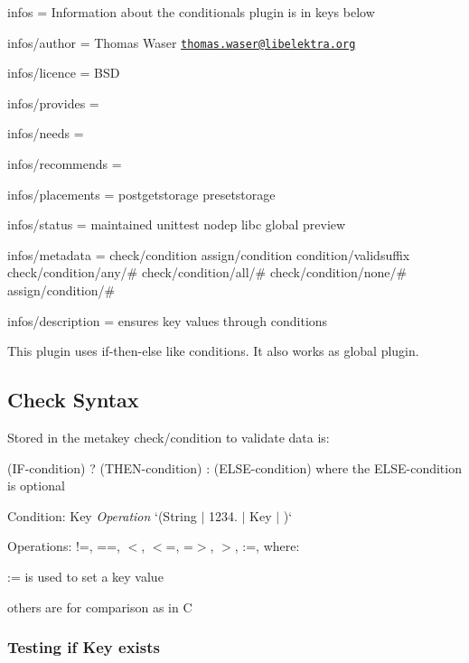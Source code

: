 
\begin{DoxyItemize}
\item infos = Information about the conditionals plugin is in keys below
\item infos/author = Thomas Waser \href{mailto:thomas.waser@libelektra.org}{\tt thomas.\+waser@libelektra.\+org}
\item infos/licence = B\+SD
\item infos/provides =
\item infos/needs =
\item infos/recommends =
\item infos/placements = postgetstorage presetstorage
\item infos/status = maintained unittest nodep libc global preview
\item infos/metadata = check/condition assign/condition condition/validsuffix check/condition/any/\# check/condition/all/\# check/condition/none/\# assign/condition/\#
\item infos/description = ensures key values through conditions
\end{DoxyItemize}

This plugin uses if-\/then-\/else like conditions. It also works as global plugin.

\subsection*{Check Syntax}

Stored in the metakey {\ttfamily check/condition} to validate data is\+:

{\ttfamily (I\+F-\/condition) ? (T\+H\+E\+N-\/condition) \+: (E\+L\+S\+E-\/condition)} where the E\+L\+S\+E-\/condition is optional

Condition\+: {\ttfamily Key} {\itshape Operation} `(\textquotesingle{}String\textquotesingle{} $\vert$ \textquotesingle{}1234.\textquotesingle{} $\vert$ Key $\vert$ \textquotesingle{}\textquotesingle{})`

Operations\+: {\ttfamily !=, ==, $<$, $<$=, =$>$, $>$, \+:=}, where\+:


\begin{DoxyItemize}
\item {\ttfamily \+:=} is used to set a key value
\item others are for comparison as in C
\end{DoxyItemize}

\subsubsection*{Testing if Key exists}

